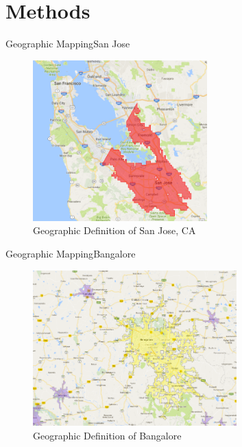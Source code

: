 \documentclass{beamer}
\begin{document}
\section{Methods}

\begin{frame}{Geographic Mapping}{San Jose}
\begin{figure}[h!]
\begin{centering}
  \includegraphics[width=0.6\textwidth]{SanJose}
  \caption{Geographic Definition of San Jose, CA}
   \label{fig:SanJose}
\end{centering}
\end{figure}
\end{frame}

\begin{frame}{Geographic Mapping}{Bangalore}
\begin{figure}[h!]
\begin{centering}
  \includegraphics[width=0.7\textwidth]{Bangalore}
  \caption{Geographic Definition of Bangalore}
   \label{fig:Bangalore}
\end{centering}
\end{figure}
\end{frame}
\end{document}
